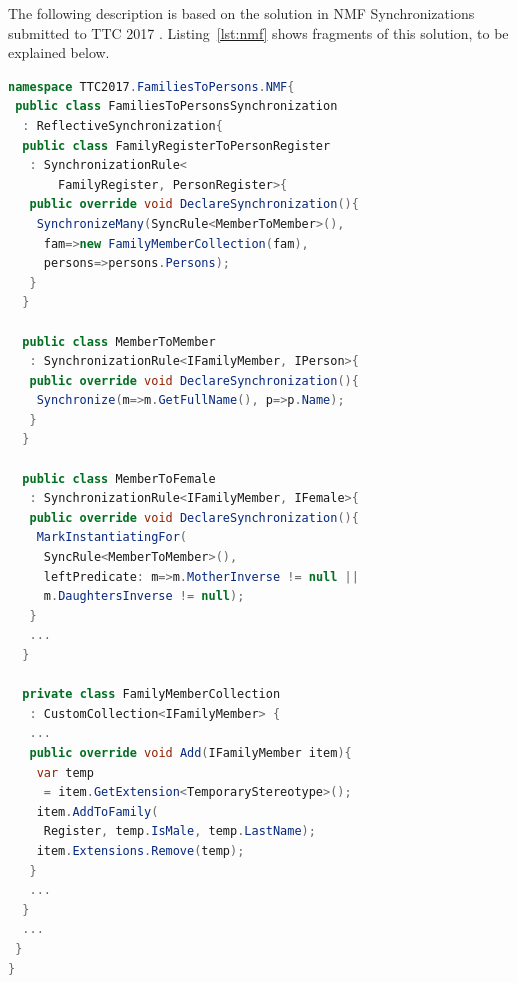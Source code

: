 
The following description is based on the solution in NMF Synchronizations submitted to TTC 2017 \cite{Hinkel2017}. Listing~\ref{lst:nmf} shows fragments of this solution, to be explained below.



\begin{lstlisting}[label={lst:nmf}, float=hbt!, language=cs, caption={Solution in NMF Synchronizations}]
namespace TTC2017.FamiliesToPersons.NMF{
 public class FamiliesToPersonsSynchronization 
  : ReflectiveSynchronization{
  public class FamilyRegisterToPersonRegister 
   : SynchronizationRule<
       FamilyRegister, PersonRegister>{
   public override void DeclareSynchronization(){
    SynchronizeMany(SyncRule<MemberToMember>(),
     fam=>new FamilyMemberCollection(fam),
     persons=>persons.Persons);
   }
  }

  public class MemberToMember 
   : SynchronizationRule<IFamilyMember, IPerson>{
   public override void DeclareSynchronization(){
    Synchronize(m=>m.GetFullName(), p=>p.Name);
   }
  }
        
  public class MemberToFemale 
   : SynchronizationRule<IFamilyMember, IFemale>{
   public override void DeclareSynchronization(){
    MarkInstantiatingFor(
     SyncRule<MemberToMember>(), 
     leftPredicate: m=>m.MotherInverse != null ||
     m.DaughtersInverse != null);
   }
   ...
  }
        
  private class FamilyMemberCollection 
   : CustomCollection<IFamilyMember> {
   ...
   public override void Add(IFamilyMember item){
    var temp 
     = item.GetExtension<TemporaryStereotype>();
    item.AddToFamily(
     Register, temp.IsMale, temp.LastName);
    item.Extensions.Remove(temp);
   }
   ...
  }
  ...
 }
}
\end{lstlisting} 

